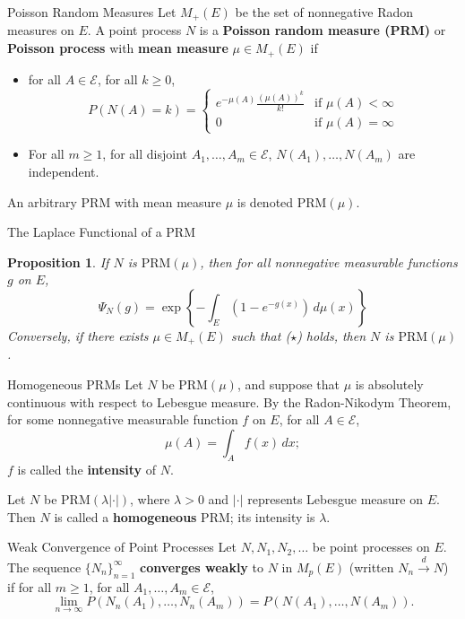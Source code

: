 \documentclass{beamer}
\newcommand{\PRM}{\text{PRM}}
\newtheorem{proposition}{Proposition}
\begin{document}
\begin{frame}{Poisson Random Measures}
    Let $M_+(E)$ be the set of nonnegative Radon measures on $E$. A point process $N$ is a \textbf{Poisson random measure (PRM)} or \textbf{Poisson process} with \textbf{mean measure} $\mu \in M_+(E)$ if
    \begin{itemize}
    \item for all $A \in \mathcal{E}$, for all $k \ge 0$,
    \[
    P(N(A) = k) =
        \begin{cases}
            e^{-\mu(A)}\frac{(\mu(A))^k}{k!} & \text{if $\mu(A) < \infty$} \\
            0 & \text{if $\mu(A) = \infty$}
        \end{cases}
    \]
    \item For all $m \ge 1$, for all disjoint $A_1, \ldots, A_m \in \mathcal{E}$, $N(A_1), \ldots, N(A_m)$ are independent.
    \end{itemize}
    An arbitrary PRM with mean measure $\mu$ is denoted $\PRM(\mu)$.
\end{frame}

\begin{frame}{The Laplace Functional of a PRM}
    \begin{proposition}
        If $N$ is $\PRM(\mu)$, then for all nonnegative measurable functions $g$ on $E$,
        \[
        \Psi_N(g) = \exp\left\{-\int_E \left(1 - e^{-g(x)}\right)\,d\mu(x)\right\} \tag{$\star$}
        \]
        Conversely, if there exists $\mu \in M_+(E)$ such that ($\star$) holds, then $N$ is $\PRM(\mu)$.
    \end{proposition}
\end{frame}

\begin{frame}{Homogeneous PRMs}
    Let $N$ be $\PRM(\mu)$, and suppose that $\mu$ is absolutely continuous with respect to Lebesgue measure. By the Radon-Nikodym Theorem, for some nonnegative measurable function $f$ on $E$, for all $A \in \mathcal{E}$,
    \[
    \mu(A) = \int_A f(x)\,dx;
    \]
    $f$ is called the \textbf{intensity} of $N$.

    \smallskip
    
    Let $N$ be $\PRM(\lambda|\cdot|)$, where $\lambda > 0$ and $|\cdot|$ represents Lebesgue measure on $E$. Then $N$ is called a \textbf{homogeneous} PRM; its intensity is $\lambda$.
\end{frame}

\begin{frame}{Weak Convergence of Point Processes}
    Let $N, N_1, N_2, \ldots$ be point processes on $E$. The sequence $\{N_n\}_{n = 1}^{\infty}$ \textbf{converges weakly} to $N$ in $M_p(E)$ (written $N_n \xrightarrow{d} N$) if for all $m \ge 1$, for all $A_1, \ldots, A_m \in \mathcal{E}$,
    \[
    \lim_{n \to \infty} P(N_n(A_1), \ldots, N_n(A_m)) = P(N(A_1), \ldots, N(A_m)).
    \]
\end{frame}
\end{document}
